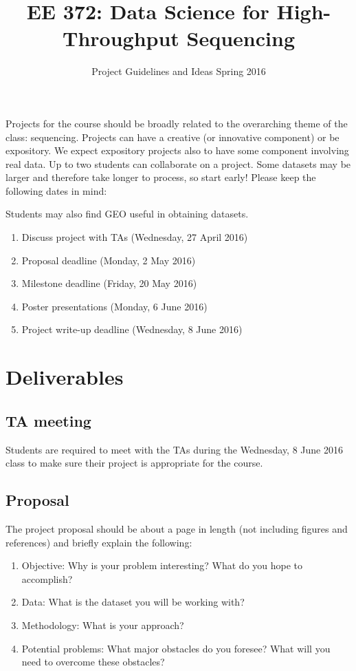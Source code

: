 \documentclass[11pt,onecolumn]{article}
\title{EE 372: Data Science for High-Throughput Sequencing}
\author{Project Guidelines and Ideas Spring 2016}
\date{\vspace{-5ex}}
\begin{document}
\maketitle

Projects for the course should be broadly related to the overarching theme of the class: sequencing.
Projects can have a creative (or innovative component) or be expository. We expect
expository projects also to have some component involving real data.
Up to two students can collaborate on a project. Some datasets may be larger
and therefore take longer to process, so start early! Please keep the following dates in mind:

Students may also find GEO useful in obtaining datasets.

\begin{enumerate}
	\item Discuss project with TAs (Wednesday, 27 April 2016)
	\item Proposal deadline (Monday, 2 May 2016)
	\item Milestone deadline (Friday, 20 May 2016)
	\item Poster presentations (Monday, 6 June 2016)
	\item Project write-up deadline (Wednesday, 8 June 2016)
\end{enumerate}

\section{Deliverables}
\subsection{TA meeting}
Students are required to meet with the TAs during the Wednesday, 8 June 2016 class to make sure their project is appropriate for the course.

\subsection{Proposal}
The project proposal should be about a page in length (not including figures and references) and briefly explain the following:
\begin{enumerate}
	\item Objective: Why is your problem interesting? What do you hope to accomplish?
	\item Data: What is the dataset you will be working with? 
	\item Methodology: What is your approach?
	\item Potential problems: What major obstacles do you foresee? What will you need to overcome these obstacles?
\end{enumerate}
\end{document}
